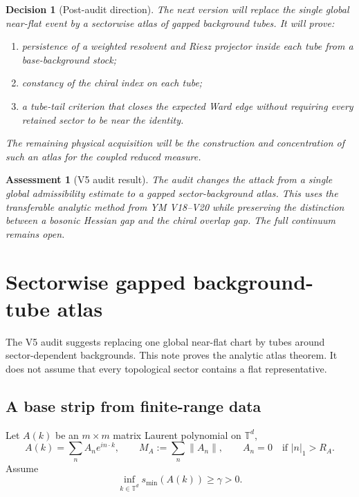 \documentclass[11pt]{article}
\newtheorem{assessment}[theorem]{Assessment}
\newtheorem{decision}[theorem]{Decision}
\begin{document}
\begin{decision}[Post-audit direction]
\label{dec:v11v5-direction}
The next version will replace the single global near-flat event by a
sectorwise atlas of gapped background tubes.  It will prove:
\begin{enumerate}[label=\textnormal{(\alph*)}]
\item persistence of a weighted resolvent and Riesz projector inside each
tube from a base-background stock;
\item constancy of the chiral index on each tube;
\item a tube-tail criterion that closes the expected Ward edge without
requiring every retained sector to be near the identity.
\end{enumerate}
The remaining physical acquisition will be the construction and
concentration of such an atlas for the coupled reduced measure.
\end{decision}

\begin{assessment}[V5 audit result]
\label{ass:v11v5}
The audit changes the attack from a single global admissibility estimate
to a gapped sector-background atlas.  This uses the transferable analytic
method from YM V18--V20 while preserving the distinction between a
bosonic Hessian gap and the chiral overlap gap.  The full continuum remains
open.
\end{assessment}


\section{Sectorwise gapped background-tube atlas}
\label{sec:v11v6}

The V5 audit suggests replacing one global near-flat chart by tubes around
sector-dependent backgrounds.  This note proves the analytic atlas
theorem.  It does not assume that every topological sector contains a flat
representative.

\subsection{A base strip from finite-range data}

Let \(A(k)\) be an \(m\times m\) matrix Laurent polynomial on
\(\mathbb T^d\),
\[
 A(k)=\sum_{n}A_ne^{in\cdot k},
 \qquad
 M_A:=\sum_n\|A_n\|,
 \qquad
 A_n=0\quad\text{if }|n|_1>R_A.
 \tag{6.1}
\]
Assume
\[
 \inf_{k\in\mathbb T^d}s_{\min}(A(k))\geq\gamma>0.
 \tag{6.2}
\]
\end{document}
